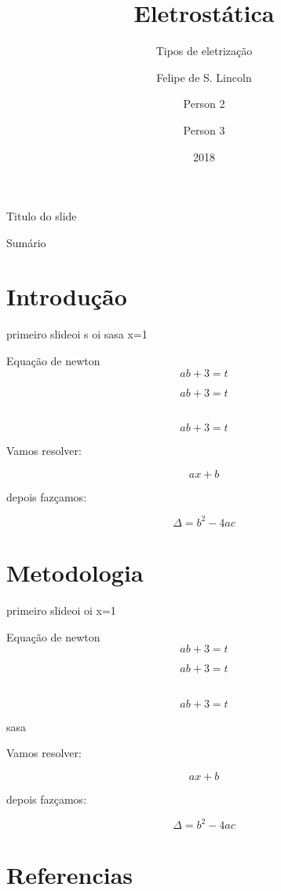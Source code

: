 \documentclass{beamer}
\title{Eletrostática}
\subtitle{Tipos de eletrização}
\author[maiara]{Felipe de S. Lincoln \and Person 2 \and Person 3}
\institute[ifsc - usp]{Instituto de Física de São Carlos, USP}
\date{2018}
\begin{document}
\begin{frame}{Titulo do slide}
\titlepage
\end{frame}

\begin{frame}{Sumário}
\tableofcontents[pausesections]
\end{frame}




\section{Introdução}
\begin{frame}{primeiro slide}{oi}
s\cite{chaikin2000principles}
oi\cite{haldane1988model}
sasa\cite{walecka1974theory}
\alert{x=1}\pause
\begin{block}{Equação de newton}
$$ab+3=t$$
\end{block}
\begin{block}{}
$$ab+3=t$$
\end{block}
\begin{block}{\ }
$$ab+3=t$$
\end{block}

\end{frame}
\begin{frame}
Vamos resolver:

$$ax+b$$

depois fazçamos:

$$\Delta = b^2-4ac$$


\end{frame}
\section{Metodologia}
\begin{frame}{primeiro slide}{oi}
oi\cite{pilbratt2010herschel}
\alert{x=1}\pause
\begin{block}{Equação de newton}
$$ab+3=t$$
\end{block}
\begin{block}{}
$$ab+3=t$$
\end{block}
\begin{block}{\ }
$$ab+3=t$$
\end{block}
sasa\cite{4}
\end{frame}
\begin{frame}
Vamos resolver:

$$ax+b$$

depois fazçamos:\cite{lovesey1984theory}

$$\Delta = b^2-4ac$$


\end{frame}

\section*{Referencias}
\begin{frame}[allowframebreaks, shrink=20]


\end{frame}
\end{document}
